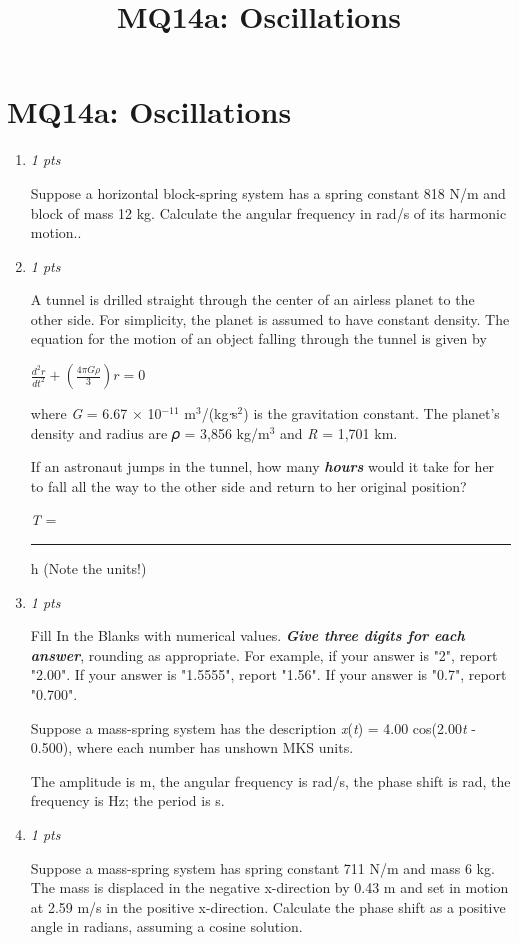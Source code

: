 \documentclass[11pt]{article}
\title{MQ14a: Oscillations}
\author{}
\date{}
\begin{document}
\maketitle

\section*{MQ14a: Oscillations}

\begin{enumerate}[leftmargin=*,label=\textbf{Question \arabic*.}]
\item \hfill \textit{1 pts}

Suppose a horizontal block-spring system has a spring constant 818 N/m and block of mass 12 kg. Calculate the angular frequency in rad/s of its harmonic motion..

\item \hfill \textit{1 pts}

A tunnel is drilled straight through the center of an airless planet to the other side. For simplicity, the planet is assumed to have constant density. The equation for the motion of an object falling through the tunnel is given by

$\frac{d^2r}{dt^2}+\left(\frac{4\pi G\rho}{3}\right)r=0$


where \emph{G} = 6.67 × 10$^{-11}$ m$^{3}$/(kgᐧ݀s$^{2}$) is the gravitation constant. The planet's density and radius are 𝜌 = 3,856 kg/m$^{3}$ and \emph{R} = 1,701 km.

If an astronaut jumps in the tunnel, how many \textbf{\emph{hours}} would it take for her to fall all the way to the other side and return to her original position?



\emph{T} = \rule{2cm}{0.4pt} h (Note the units!)

\item \hfill \textit{1 pts}

Fill In the Blanks with numerical values. \emph{\textbf{Give three digits for each answer}}, rounding as appropriate. For example, if your answer is "2", report "2.00". If your answer is "1.5555", report "1.56". If your answer is "0.7", report "0.700".



Suppose a mass-spring system has the description \emph{x}(\emph{t}) = 4.00 cos(2.00\emph{t} - 0.500), where each number has unshown MKS units.



The amplitude is
 m, the angular frequency is
 rad/s, the phase shift is
 rad, the frequency is
 Hz; the period is
 s.

\item \hfill \textit{1 pts}

Suppose a mass-spring system has spring constant 711 N/m and mass 6 kg. The mass is displaced in the negative x-direction by 0.43 m and set in motion at 2.59 m/s in the positive x-direction. Calculate the phase shift as a positive angle in radians, assuming a cosine solution.

\end{enumerate}
\end{document}
